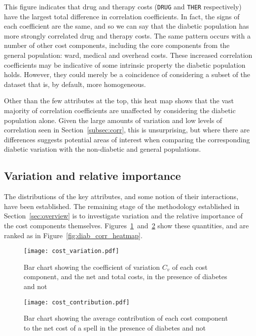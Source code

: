 This figure indicates that drug and therapy costs ({\tt DRUG} and {\tt THER}
respectively) have the largest total difference in correlation coefficients. In
fact, the signs of each coefficient are the same, and so we can say that the
diabetic population has more strongly correlated drug and therapy costs. The
same pattern occurs with a number of other cost components, including the core
components from the general population: ward, medical and overhead costs. These
increased correlation coefficients may be indicative of some intrinsic property
the diabetic population holds. However, they could merely be a coincidence of
considering a subset of the dataset that is, by default, more homogeneous.

Other than the few attributes at the top, this heat map shows that the vast
majority of correlation coefficients are unaffected by considering the diabetic
population alone. Given the large amounts of variation and low levels of
correlation seen in Section~\ref{subsec:corr}, this is unsurprising, but where
there are differences suggests potential areas of interest when comparing the
corresponding diabetic variation with the non-diabetic and general populations.


\subsection{Variation and relative importance}\label{subsec:diab_variation}

The distributions of the key attributes, and some notion of their interactions,
have been established. The remaining stage of the methodology established in
Section~\ref{sec:overview} is to investigate variation and the relative
importance of the cost components themselves.
Figures~\ref{fig:diab_variation}~and~\ref{fig:diab_contribution} show these
quantities, and are ranked as in Figure~\ref{fig:diab_corr_heatmap}.

\begin{figure}
    \centering
    \texttt{[image: cost\_variation.pdf]}
    \caption{%
        Bar chart showing the coefficient of variation \(C_{v}\) of each cost
        component, and the net and total costs, in the presence of diabetes and
        not
    }\label{fig:diab_variation}
\end{figure}

\begin{figure}
    \centering
    \texttt{[image: cost\_contribution.pdf]}
    \caption{%
        Bar chart showing the average contribution of each cost component
        to the net cost of a spell in the presence of diabetes and not
    }\label{fig:diab_contribution}
\end{figure}

